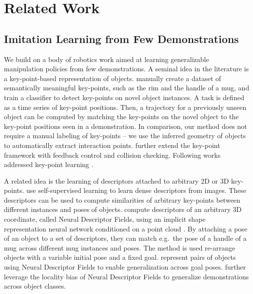 \documentclass{article}
\begin{document}
\section{Related Work}

\subsection{Imitation Learning from Few Demonstrations} 

We build on a body of robotics work aimed at learning generalizable manipulation policies from few demonstrations. A seminal idea in the literature is a key-point-based representation of objects. \citet{manuelli19kpam} manually create a dataset of semantically meaningful key-points, such as the rim and the handle of a mug, and train a classifier to detect key-points on novel object instances. A task is defined as a time series of key-point positions. Then, a trajectory for a previously unseen object can be computed by matching the key-points on the novel object to the key-point positions seen in a demonstration. In comparison, our method does not require a manual labeling of key-points -- we use the inferred geometry of objects to automatically extract interaction points. \citet{gao21kpam,gao21kpamsc} further extend the key-point framework with feedback control and collision checking. Following works addressed key-point learning \cite{1910,vecerik20s3k,manuelli20keypoints,turpin21gift}.

A related idea is the learning of descriptors attached to arbitrary 2D or 3D key-points. \citet{florence18dense} use self-supervised learning to learn dense descriptors from images. These descriptors can be used to compute similarities of arbitrary key-points between different instances and poses of objects. \citet{chen22neural} compute descriptors of an arbitrary 3D coordinate, called Neural Descriptor Fields, using an implicit shape representation neural network conditioned on a point cloud \cite{mescheder19occupancy}. By attaching a pose of an object to a set of descriptors, they can match e.g.~the pose of a handle of a mug across different mug instances and poses. The method is used re-arrange objects with a variable initial pose and a fixed goal. \citet{simeonov22se,ryu22equivariant} represent pairs of objects using Neural Descriptor Fields to enable generalization across goal poses. \citet{chun23local} further leverage the locality bias of Neural Descriptor Fields to generalize demonstrations across object classes.
\end{document}
